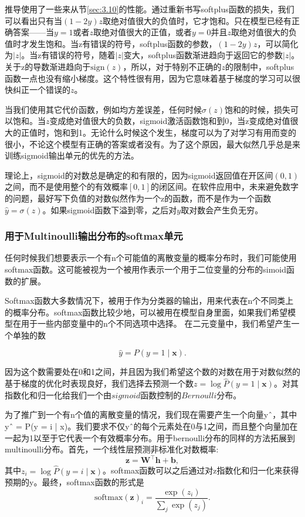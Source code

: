 推导使用了一些来从节\ref{sec:3.10}的性能。通过重新书写softplus函数的损失，我们可以看出只有当$(1 − 2y)z$取绝对值很大的负值时，它才饱和。只在模型已经有正确答案——当$y=1$或者$z$取绝对值很大的正值，或者$y=0$并且$z$取绝对值很大的负值时才发生饱和。当z有错误的符号，softplus函数的参数，$(1-2y)z$，可以简化为$|z|$。当z有错误的符号，随着$|z|$变大，softplus函数渐进趋向于返回它的参数$|z|$。关于z的导数渐进趋向于$\text{sign}(z)$，所以，对于特别不正确的$z$的限制中，softplus函数一点也没有缩小梯度。这个特性很有用，因为它意味着基于梯度的学习可以很快纠正一个错误的$z$。

当我们使用其它代价函数，例如均方差误差，任何时候$\sigma(z)$饱和的时候，损失可以饱和。当$z$变成绝对值很大的负数，sigmoid激活函数饱和到0，当z变成绝对值很大的正值时，饱和到1。无论什么时候这个发生，梯度可以为了对学习有用而变的很小，不论这个模型有正确的答案或者没有。为了这个原因，最大似然几乎总是来训练sigmoid输出单元的优先的方法。

理论上，sigmoid的对数总是确定的和有限的，因为sigmoid返回值在开区间$(0,1)$之间，而不是使用整个的有效概率$[0,1]$的闭区间。在软件应用中，未来避免数字的问题，最好写下负值的对数似然作为一个z的函数，而不是作为一个函数$\hat{y}=\sigma(z)$。如果sigmoid函数下溢到零，之后对$y$取对数会产生负无穷。

\subsubsection{用于Multinoulli输出分布的softmax单元}
\label{sec:6.2.2.3}
任何时候我们想要表示一个有n个可能值的离散变量的概率分布时，我们可能使用softmax函数。这可能被视为一个被用作表示一个用于二位变量的分布的simoid函数的扩展。

Softmax函数大多数情况下，被用于作为分类器的输出，用来代表在n个不同类上的概率分布。softmax函数比较少地，可以被用在模型自身里面，如果我们希望模型在用于一些内部变量中的n个不同选项中选择。
在二元变量中，我们希望产生一个单独的数

\begin{equation}
\hat{y} = P(y=1\mid\bm{x}).
\end{equation}

因为这个数需要处在0和1之间，并且因为我们希望这个数的对数在用于对数似然的基于梯度的优化时表现良好，我们选择去预测一个数$z=\log \hat{P}(y=1\mid\bm{x})$。对其指数化和归一化给我们一个由$sigmoid$函数控制的$Bernoulli$分布。

为了推广到一个有n个值的离散变量的情况，我们现在需要产生一个向量yˆ，其中yˆ = P(y = i | x)。我们要求不仅yˆ的每个元素处在0与1之间，而且整个向量加在一起为1以至于它代表一个有效概率分布。用于bernoulli分布的同样的方法拓展到multinoulli分布。首先，一个线性层预测非标准化对数概率:
\begin{equation}
\bm{z} = \bm{W}^\top \bm{h}+\bm{b},
\end{equation}
其中$z_i=\log \hat{P}(y=i\mid\bm{x})$。softmax函数可以之后通过对z指数化和归一化来获得预期的y。最终，softmax函数的形式是
\begin{equation}
\text{softmax}(\bm{z})_i = \frac{\exp(z_i)}{\sum_j \exp(z_j)}.
\end{equation}

